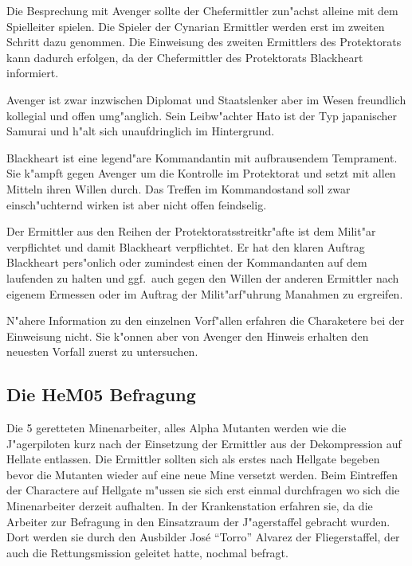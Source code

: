 \begin{remarks}
Die Besprechung mit Avenger sollte der Chefermittler zun"achst alleine mit dem Spielleiter spielen. Die Spieler der Cynarian Ermittler werden erst im zweiten Schritt dazu genommen. Die Einweisung des zweiten Ermittlers des Protektorats kann dadurch erfolgen, da\3 der Chefermittler des Protektorats Blackheart informiert.

Avenger ist zwar inzwischen Diplomat und Staatslenker aber im Wesen freundlich kollegial und offen umg"anglich. Sein Leibw"achter Hato ist der Typ japanischer Samurai und h"alt sich unaufdringlich im Hintergrund.

Blackheart ist eine legend"are Kommandantin mit aufbrausendem Temprament. Sie k"ampft gegen Avenger um die Kontrolle im Protektorat und setzt mit allen Mitteln ihren Willen durch. Das Treffen im Kommandostand soll zwar einsch"uchternd wirken ist aber nicht offen feindselig.

Der Ermittler aus den Reihen der Protektoratsstreitkr"afte ist dem Milit"ar verpflichtet und damit Blackheart verpflichtet. Er hat den klaren Auftrag Blackheart pers"onlich oder zumindest einen der Kommandanten auf dem laufenden zu halten und ggf.~auch gegen den Willen der anderen Ermittler nach eigenem Ermessen oder im Auftrag der Milit"arf"uhrung Ma\3nahmen zu ergreifen.

N"ahere Information zu den einzelnen Vorf"allen erfahren die Charaketere bei der Einweisung nicht. Sie k"onnen aber von Avenger den Hinweis erhalten den neuesten Vorfall zuerst zu untersuchen.
\end{remarks}

\subsection{Die HeM05 Befragung}

Die 5 geretteten Minenarbeiter, alles Alpha Mutanten werden wie die J"agerpiloten kurz nach der Einsetzung der Ermittler aus der Dekompression auf Hellate entlassen. Die Ermittler sollten sich als erstes nach Hellgate begeben bevor die Mutanten wieder auf eine neue Mine versetzt werden. Beim Eintreffen der Charactere auf Hellgate
m"ussen sie sich erst einmal durchfragen wo sich die Minenarbeiter derzeit aufhalten. In der Krankenstation erfahren sie, da\3 die Arbeiter zur Befragung in den Einsatzraum der J"agerstaffel gebracht wurden. Dort werden sie durch den Ausbilder José ``Torro'' Alvarez der Fliegerstaffel, der auch die Rettungsmission geleitet hatte, nochmal befragt.


